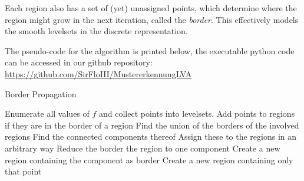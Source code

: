 \documentclass[11pt,twoside,twocolumn,a4paper]{article}
\theoremstyle{plain}
\theoremstyle{definition}
\begin{document}
Each region also has a set of (yet) unassigned points, which determine where the region might grow in the next iteration, called the \emph{border}.
This effectively models the smooth levelsets in the discrete representation.

The pseudo-code for the algorithm is printed below, the executable python code can be accessed in our github repository:
\url{https://github.com/SirFloIII/MustererkennungLVA}

\begin{algorithm}
\caption{Border Propagation}
\begin{algorithmic}
\State Enumerate all values of $f$ and collect points into levelsets.
    \State Add points to regions if they are in the border of a region
        \State Find the union of the borders of the involved regions
        \State Find the connected components thereof
        \State Assign these to the regions in an arbitrary way
	\EndIf
        \State Reduce the border the region to one component
            \State Create a new region containing the component as border
		\EndFor
    \EndIf
        \State Create a new region containing only that point
	\EndFor
\EndFor
\end{algorithmic}
\end{algorithm}
\end{document}
